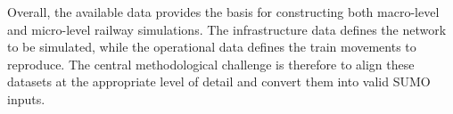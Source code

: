 Overall, the available data provides the basis for constructing both macro-level and micro-level railway simulations. The 
infrastructure data defines the network to be simulated, while the operational data defines the train movements to 
reproduce. The central methodological challenge is therefore to align these datasets at the appropriate level of detail and 
convert them into valid SUMO inputs.

